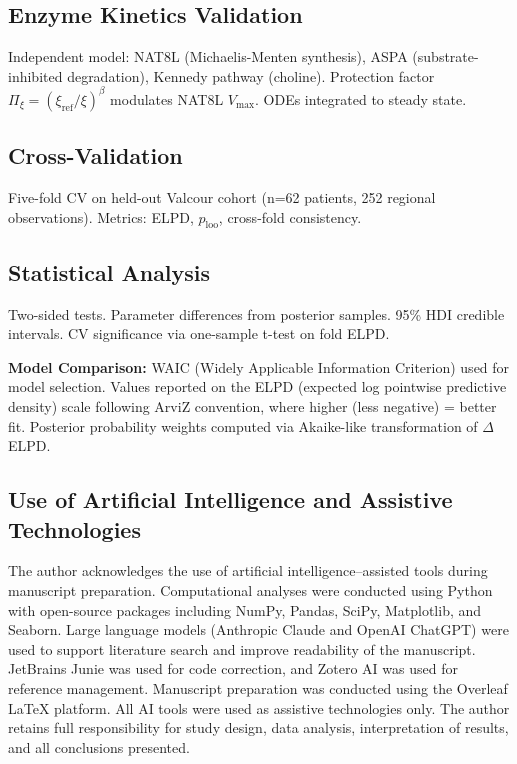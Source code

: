 \documentclass[10pt,a4paper]{article}
\begin{document}
\subsection{Enzyme Kinetics Validation}

Independent model: NAT8L (Michaelis-Menten synthesis), ASPA (substrate-inhibited degradation), Kennedy pathway (choline). Protection factor $\Pi_\xi = (\xi_{\text{ref}}/\xi)^\beta$ modulates NAT8L $V_{\text{max}}$. ODEs integrated to steady state.

\subsection{Cross-Validation}

Five-fold CV on held-out Valcour cohort (n=62 patients, 252 regional observations). Metrics: ELPD, $p_{\text{loo}}$, cross-fold consistency.

\subsection{Statistical Analysis}

Two-sided tests. Parameter differences from posterior samples. 95\% HDI credible intervals. CV significance via one-sample t-test on fold ELPD.

\textbf{Model Comparison:} WAIC (Widely Applicable Information Criterion) used for model selection. Values reported on the ELPD (expected log pointwise predictive density) scale following ArviZ convention, where higher (less negative) = better fit. Posterior probability weights computed via Akaike-like transformation of $\Delta$ELPD.

\subsection{Use of Artificial Intelligence and Assistive Technologies}
The author acknowledges the use of artificial intelligence–assisted tools during manuscript preparation. Computational analyses were conducted using Python with open-source packages including NumPy, Pandas, SciPy, Matplotlib, and Seaborn. Large language models (Anthropic Claude and OpenAI ChatGPT) were used to support literature search and improve readability of the manuscript. JetBrains Junie was used for code correction, and Zotero AI was used for reference management. Manuscript preparation was conducted using the Overleaf LaTeX platform. All AI tools were used as assistive technologies only. The author retains full responsibility for study design, data analysis, interpretation of results, and all conclusions presented.
\end{document}
